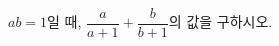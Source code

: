 \hspace*{2mm}\begin{minipage}[t]{\dimexpr\linewidth-2mm\relax}\vspace{0pt}
$ab=1$일 때, $\dfrac{a}{a+1}+\dfrac{b}{b+1}$의 값을 구하시오. \end{minipage}
